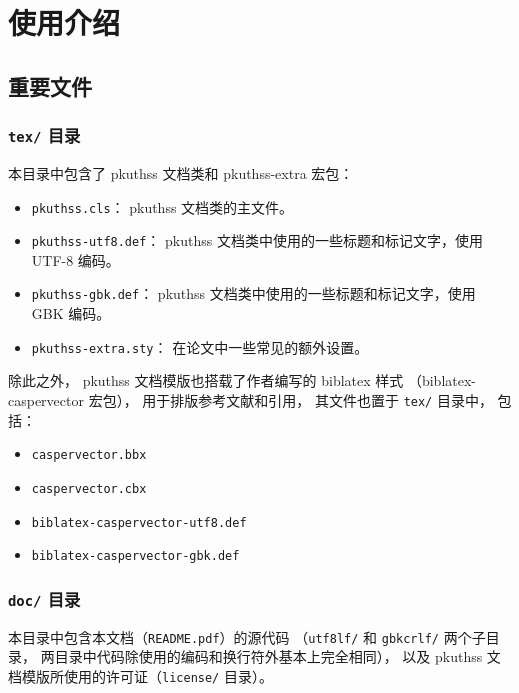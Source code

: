 %

\chapter{使用介绍}
	\section{重要文件}
	\subsection{\texttt{tex/} 目录}

	本目录中包含了 pkuthss 文档类和 pkuthss-extra 宏包：
	\begin{itemize}
		\item \verb|pkuthss.cls|：%
			pkuthss 文档类的主文件。
		\item \verb|pkuthss-utf8.def|：%
			pkuthss 文档类中使用的一些标题和标记文字，使用 UTF-8 编码。
		\item \verb|pkuthss-gbk.def|：%
			pkuthss 文档类中使用的一些标题和标记文字，使用 GBK 编码。
		\item \verb|pkuthss-extra.sty|：
			在论文中一些常见的额外设置。
	\end{itemize}

	除此之外，
	pkuthss 文档模版也搭载了作者编写的 biblatex\supercite{biblatex} 样式
	（biblatex-caspervector 宏包\supercite{biblatex-caspervector}），
	用于排版参考文献和引用，
	其文件也置于 \verb|tex/| 目录中，
	包括：
	\begin{itemize}
		\item \verb|caspervector.bbx|
		\item \verb|caspervector.cbx|
		\item \verb|biblatex-caspervector-utf8.def|
		\item \verb|biblatex-caspervector-gbk.def|
	\end{itemize}
	
	\subsection{\texttt{doc/} 目录}\label{ssec:doc-dir}

	本目录中包含本文档（\verb|README.pdf|）的源代码%
	（\verb|utf8lf/| 和 \verb|gbkcrlf/| 两个子目录，
	两目录中代码除使用的编码和换行符外基本上完全相同），
	以及 pkuthss 文档模版所使用的许可证（\verb|license/| 目录）。

